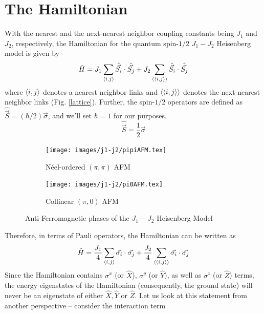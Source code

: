 \documentclass[../thesis_main.tex]{subfiles}
\begin{document}
\section{The Hamiltonian}
With the nearest and the next-nearest neighbor coupling constants being $J_1$ and $J_2$, respectively, the Hamiltonian for the quantum spin-$1/2$ $J_1 - J_2$ Heisenberg model is given by
\begin{equation}
    \hat{H} = J_1 \sum_{\expval{i, j}} \hat{\vec{S_i}} \cdot \hat{\vec{S_j}} + J_2 \sum_{\expval{\expval{i, j}}} \hat{\vec{S_i}} \cdot \hat{\vec{S_j}}
\end{equation} 
where $\expval{i, j}$ denotes a nearest neighbor links and $\expval{\expval{i,j}}$ denotes the next-nearest neighbor links (Fig. \ref{lattice}). Further, the spin-$1/2$ operators are defined as $\hat{\vec{S}} = (\hbar/2) \vec{\sigma}$, and we'll set $\hbar = 1$ for our purposes.\begin{equation}
    \hat{\vec{S}} = \frac{1}{2} \vec{\sigma}
\end{equation}
\begin{figure}[t!]
    \centering
    \begin{subfigure}[b]{0.3\textwidth}  %
        \centering
        \texttt{[image: images/j1-j2/pipiAFM.tex]}
        \caption{Néel-ordered $(\pi, \pi)$ AFM}
    \end{subfigure}
    \hspace{3em}  %
    \begin{subfigure}[b]{0.3\textwidth}
        \centering
        \texttt{[image: images/j1-j2/pi0AFM.tex]}
        \caption{Collinear $(\pi, 0)$ AFM}
    \end{subfigure}
    \caption{Anti-Ferromagnetic phases of the $J_1 - J_2$ Heisenberg Model}
    \label{AFM}
\end{figure}
Therefore, in terms of Pauli operators, the Hamiltonian can be written as 
\begin{equation}
    \hat{H} = \frac{J_1}{4} \sum_{\expval{i,j}} \vec{\sigma_i} \cdot \vec{\sigma_j} + \frac{J_2}{4} \sum_{\expval{\expval{i, j}}} \vec{\sigma_i} \cdot \vec{\sigma_j}
\end{equation}
Since the Hamiltonian contains $\sigma^x$ (or $\hat{X}$), $\sigma^y$ (or $\hat{Y}$), as well as $\sigma^z$ (or $\hat{Z}$) terms, the energy eigenstates of the Hamiltonian (consequently, the ground state) will never be an eigenstate of either $\hat{X}, \hat{Y}$ or $\hat{Z}$. Let us look at this statement from another perspective -- consider the interaction term 
\end{document}
